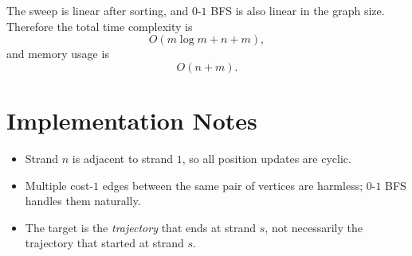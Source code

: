 \documentclass[11pt]{article}
\begin{document}
The sweep is linear after sorting, and $0$-$1$ BFS is also linear in the graph size. Therefore the total
time complexity is
\[
    O(m \log m + n + m),
\]
and memory usage is
\[
    O(n+m).
\]

\section*{Implementation Notes}

\begin{itemize}[leftmargin=*]
    \item Strand $n$ is adjacent to strand $1$, so all position updates are cyclic.
    \item Multiple cost-$1$ edges between the same pair of vertices are harmless; $0$-$1$ BFS handles
    them naturally.
    \item The target is the \emph{trajectory} that ends at strand $s$, not necessarily the trajectory that
    started at strand $s$.
\end{itemize}
\end{document}
